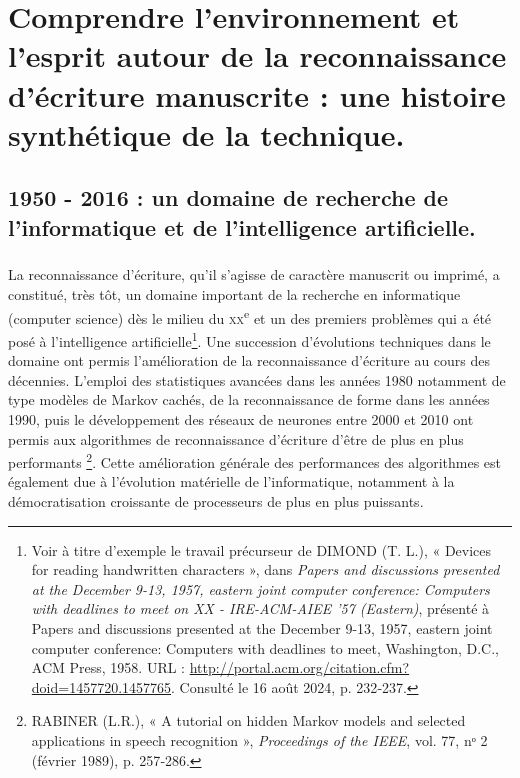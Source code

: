 \documentclass[a4paper,12pt,twoside]{book}
\begin{document}
	\newpage{\pagestyle{empty}\cleardoublepage}
	
	\mainmatter
	
	

	\chapter{Comprendre l'environnement et l'esprit autour de la reconnaissance d'écriture manuscrite : une histoire synthétique de la technique.}

	\section{1950 - 2016 : un domaine de recherche de l'informatique et de l'intelligence artificielle.}
	
	
\paragraph{}
La reconnaissance d’écriture, qu’il s’agisse de caractère manuscrit ou imprimé, a constitué, très tôt, un domaine important de la recherche en informatique (computer science) dès le milieu du \textsc{xx}\textsuperscript{e} et un des premiers problèmes qui a été posé à l’intelligence artificielle\footnote{Voir à titre d’exemple le travail précurseur de \textsc{DIMOND} (T. L.), « Devices for reading handwritten characters », dans \emph{Papers and discussions presented at the December 9-13, 1957, eastern joint computer conference: Computers with deadlines to meet on XX - IRE-ACM-AIEE ’57 (Eastern)}, présenté à Papers and discussions presented at the December 9-13, 1957, eastern joint computer conference: Computers with deadlines to meet, Washington, D.C., ACM Press, 1958. URL : \url{http://portal.acm.org/citation.cfm?doid=1457720.1457765}. Consulté le 16 août 2024, p. 232‑237.}. Une succession d’évolutions techniques dans le domaine ont permis l’amélioration de la reconnaissance d’écriture au cours des décennies. L’emploi des statistiques avancées dans les années 1980 notamment de type modèles de Markov cachés, de la reconnaissance de forme dans les années 1990, puis le développement des réseaux de neurones entre 2000 et 2010 ont permis aux algorithmes de reconnaissance d’écriture d’être de plus en plus performants \footnote{\textsc{RABINER} (L.R.), « A tutorial on hidden Markov models and selected applications in speech recognition », \emph{Proceedings of the IEEE}, vol. 77, nᵒ 2 (février 1989), p. 257‑286.}. Cette amélioration générale des performances des algorithmes est également due à l’évolution matérielle de l’informatique, notamment à la démocratisation croissante de processeurs de plus en plus puissants. 
\end{document}
